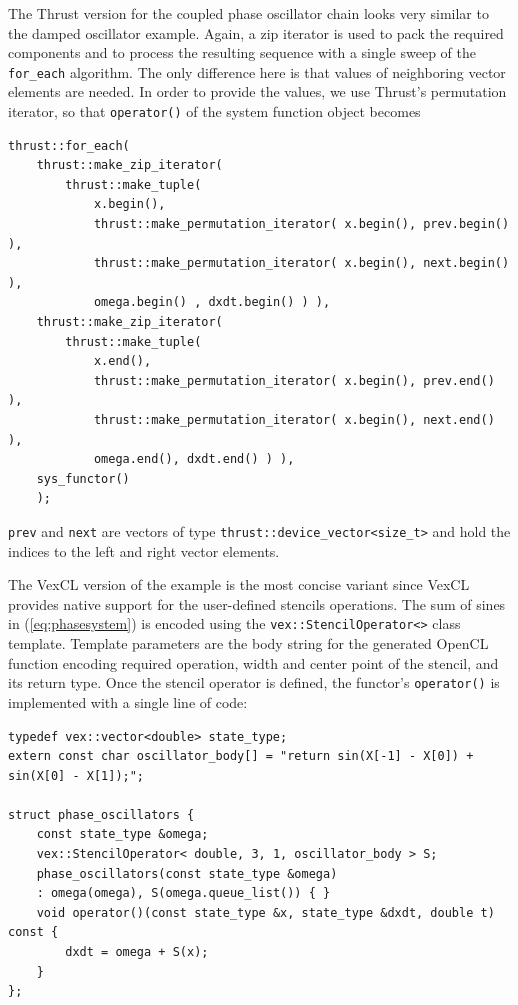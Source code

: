 \documentclass[final]{siamltex}
\newcommand{\code}[1]{\lstinline|#1|}
\newcommand{\eqref}[1]{(\ref{#1})}
\begin{document}
The Thrust version for the coupled phase oscillator chain looks very similar to
the damped oscillator example. Again, a zip iterator is used to pack the required
components and to process the resulting sequence with a single sweep of the
\code{for_each} algorithm. The only difference here is that values of
neighboring vector elements are needed. In order to provide the values, we use Thrust's
permutation iterator, so that \code{operator()} of the system function object becomes
\begin{lstlisting}
thrust::for_each(
    thrust::make_zip_iterator(
        thrust::make_tuple(
            x.begin(),
            thrust::make_permutation_iterator( x.begin(), prev.begin() ),
            thrust::make_permutation_iterator( x.begin(), next.begin() ),
            omega.begin() , dxdt.begin() ) ),
    thrust::make_zip_iterator(
        thrust::make_tuple(
            x.end(),
            thrust::make_permutation_iterator( x.begin(), prev.end() ),
            thrust::make_permutation_iterator( x.begin(), next.end() ),
            omega.end(), dxdt.end() ) ),
    sys_functor()
    );
\end{lstlisting}
\code{prev} and \code{next} are vectors of type
\code{thrust::device_vector<size_t>} and hold the indices to the left and right vector
elements.

The VexCL version of the example is the most
concise variant since VexCL provides native support for the user-defined
stencils operations. The sum of sines in \eqref{eq:phasesystem} is encoded
using the \code{vex::StencilOperator<>} class template. Template parameters
are the body string for the generated OpenCL function encoding required
operation, width and center point of the stencil, and its return type. Once the
stencil operator is defined, the functor's \code{operator()} is implemented
with a single line of code:
\begin{lstlisting}
typedef vex::vector<double> state_type;
extern const char oscillator_body[] = "return sin(X[-1] - X[0]) + sin(X[0] - X[1]);";

struct phase_oscillators {
    const state_type &omega;
    vex::StencilOperator< double, 3, 1, oscillator_body > S;
    phase_oscillators(const state_type &omega)
	: omega(omega), S(omega.queue_list()) { }
    void operator()(const state_type &x, state_type &dxdt, double t) const {
        dxdt = omega + S(x);
    }
};
\end{lstlisting}
\end{document}
